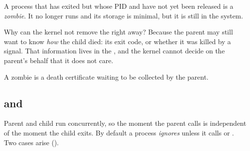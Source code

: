 \begin{definition}[Zombie]
  A process that has exited but whose PID and \ts{} have not yet been released is a \emph{zombie}. It no longer runs and its storage is minimal, but it is still in the system.
\end{definition}

Why can the kernel not remove the \ts{} right away? Because the parent may still want to know \emph{how} the child died: its exit code, or whether it was killed by a signal. That information lives in the \ts{}, and the kernel cannot decide on the parent's behalf that it does not care.

\begin{keypoint}
  A zombie is a death certificate waiting to be collected by the parent.
\end{keypoint}

\subsection{\texorpdfstring{}{wait()} and \texorpdfstring{}{waitpid()}}

Parent and child run concurrently, so the moment the parent calls  is independent of the moment the child exits. By default a process \emph{ignores}  unless it calls  or . Two cases arise ().


